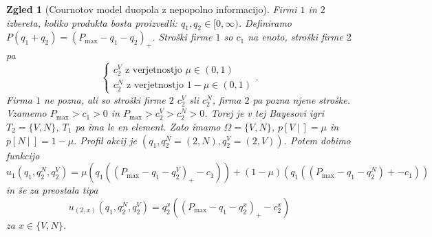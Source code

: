 \documentclass[10pt, a4paper]{article}
\newtheorem{zgled}[izr]{Zgled}
\begin{document}
\begin{zgled}[Cournotov model duopola z nepopolno informacijo]
  Firmi $1$ in $2$ izbereta, koliko produkta bosta proizvedli: $q_1, q_2 \in [0, \infty)$.
  Definiramo $P(q_1 + q_2) = (P_{\max} -q_1 - q_2)_+$.
  Stroški firme $1$ so $c_1$ na enoto, stroški firme $2$ pa 
  $$\begin{cases}
    \text{$c_2^V$ z verjetnostjo $\mu \in (0, 1)$}\\
    \text{$c_2^N$ z verjetnostjo $1 - \mu \in (0, 1)$}
  \end{cases}.$$
  Firma $1$ ne pozna, ali so stroški firme $2$ $c_2^V$ sli $c_2^N$, firma $2$ pa pozna njene stroške.
  Vzamemo $P_{\max} > c_1 > 0$ in $P_{\max} > c_2^V > c_2^N > 0$.
  Torej je v tej Bayesovi igri $T_2 = \{V, N\}$, $T_1$ pa ima le en element.
  Zato imamo $\Omega = \{V, N\}$, $p[V\ |\ ] = \mu$ in $p[N\ |\ ] = 1 - \mu.$
  Profil akcij je $(q_1, q_2^N = (2, N), q_2^V = (2, V))$.
  Potem dobimo funkcijo 
  $$u_1 (q_1, q_2^N, q_2^V) = \mu (q_1 ((P_{\max} -q_1 -q_2^V)_+ - c_1)) + (1 - \mu) (q_1 ((P_{\max} -q_1 -q_2^N)+ - c_1))$$
  in še za preostala tipa 
  $$u_{(2, x)} (q_1, q_2^N, q_2^V) = q_2^x((P_{\max} - q_1 - q_2^x)_+ - c_2^x)$$
  za $x \in \{V, N\}$.
\end{zgled}
\end{document}
